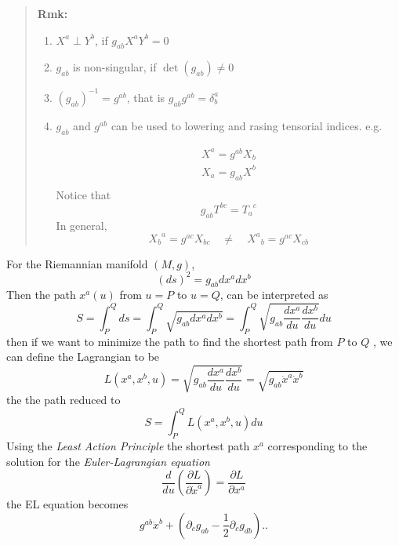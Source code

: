 \begin{quote}
	\textbf{Rmk:}
\begin{enumerate}
	\item $X^{a}\perp Y^{b}$, if $g_{ab}X^{a}Y^b = 0$

	\item $g_{ab}$ is non-singular, if $\det(g_{ab}) \neq 0$

	\item $(g_{ab})^{-1}=g^{ab}$, that is $g_{ab}g^{ab} = \delta^{a}_{b}$

	\item $g_{ab}$ and $g^{ab}$ can be used to lowering and rasing tensorial indices. e.g.

\begin{equation}
\begin{aligned}
X^{a} = g^{ab}X_{b}\\
X_{a} = g_{ab}X^{b}\\
\end{aligned}
\end{equation}
Notice that
\begin{equation}
g_{ab}T^{bc} = {T_{a}}^{c}
\end{equation}
In general,
\begin{equation}
{X_{b}}^{a} = g^{ac}X_{bc}
\quad\neq\quad
{X^{a}}_{b} = g^{ac}X_{cb}
\end{equation}

\end{enumerate}

\end{quote}
For the Riemannian manifold $(M,g)$,
\begin{equation}
(ds)^2 = g_{ab} dx^a dx^b
\end{equation}
Then the path $x^{a}(u)$  from $u=P$ to $u=Q$, can be interpreted as
\begin{equation}
S
= \int_{P}^{Q} ds
= \int_{P}^{Q} \sqrt{g_{ab}dx^a dx^b}
= \int_{P}^{Q} \sqrt{g_{ab}\frac{dx^a}{du}\frac{dx^b}{du}} du
\end{equation}
then if we want to minimize the path to find the shortest path from $P$ to $Q$ , we can define the Lagrangian to be
\begin{equation}
L(x^{a}, x^{b}, u) = \sqrt{g_{ab}\frac{dx^a}{du}\frac{dx^b}{du}} = \sqrt{g_{ab}\dot{x}^{a}\dot{x}^b}
\end{equation}
the the path reduced to 
\begin{equation}
S = \int_{P}^{Q}L(x^{a}, x^{b}, u)du
\end{equation}
Using the \textit{Least Action Principle} the shortest path $x^{a}$ corresponding to the solution for the \textit{Euler-Lagrangian equation}
\begin{equation}
\frac{d}{du}\left(\frac{\partial L}{\partial \dot{x}^{a}}\right) = \frac{\partial L}{\partial x^{a}}
\end{equation}
the EL equation becomes
\begin{equation}
g^{ab}\ddot{x}^{b} + \left(\partial_{c}g_{ab} -\frac{1}{2}\partial_{c}g_{db}\right) ..
\end{equation}



